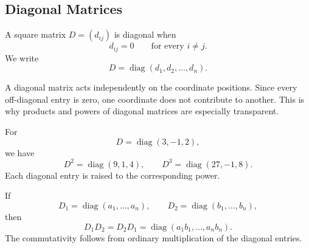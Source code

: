 \subsection{Diagonal Matrices}

\begin{definitionbox}
A square matrix $D=(d_{ij})$ is diagonal when
\[
d_{ij}=0
\qquad\text{for every }i\neq j.
\]
We write
\[
D=\operatorname{diag}(d_1,d_2,\ldots,d_n).
\]
\end{definitionbox}

\begin{interpretationbox}
A diagonal matrix acts independently on the coordinate positions. Since every
off-diagonal entry is zero, one coordinate does not contribute to another. This
is why products and powers of diagonal matrices are especially transparent.
\end{interpretationbox}

\begin{examplebox}
For
\[
D=\operatorname{diag}(3,-1,2),
\]
we have
\[
D^2=\operatorname{diag}(9,1,4),
\qquad
D^3=\operatorname{diag}(27,-1,8).
\]
Each diagonal entry is raised to the corresponding power.
\end{examplebox}

\begin{theorembox}
If
\[
D_1=\operatorname{diag}(a_1,\ldots,a_n),
\qquad
D_2=\operatorname{diag}(b_1,\ldots,b_n),
\]
then
\[
D_1D_2=D_2D_1
=\operatorname{diag}(a_1b_1,\ldots,a_nb_n).
\]
The commutativity follows from ordinary multiplication of the diagonal entries.
\end{theorembox}
